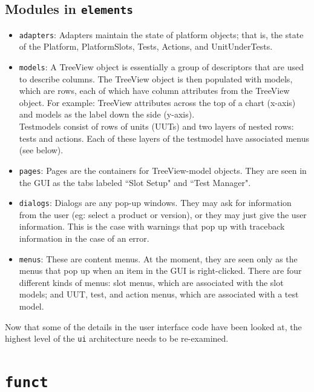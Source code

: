 \documentclass{report}
\begin{document}
\subsection{Modules in \texttt{elements}}

\begin{itemize}
	\item\texttt{adapters}: Adapters maintain the state of platform objects; that is, the state of the Platform, PlatformSlots, Tests, Actions, and UnitUnderTests.
	\item\texttt{models}: A TreeView object is essentially a group of descriptors that are used to describe columns. The TreeView object is then populated with models, which are rows, each of which have column attributes from the TreeView object. For example: TreeView attributes across the top of a chart (x-axis) and models as the label down the side (y-axis).\\
	Testmodels consist of rows of units (UUTs) and two layers of nested rows: tests and actions. Each of these layers of the testmodel have associated menus (see below).
	\item\texttt{pages}: Pages are the containers for TreeView-model objects. They are seen in the GUI as the tabs labeled ``Slot Setup" and ``Test Manager".
	\item\texttt{dialogs}: Dialogs are any pop-up windows. They may ask for information from the user (eg: select a product or version), or they may just give the user information. This is the case with warnings that pop up with traceback information in the case of an error.
	\item\texttt{menus}: These are content menus. At the moment, they are seen only as the menus that pop up when an item in the GUI is right-clicked. There are four different kinds of menus: slot menus, which are associated with the slot models; and UUT, test, and action menus, which are associated with a test model.
\end{itemize}

Now that some of the details in the user interface code have been looked at, the highest level of the \texttt{ui} architecture needs to be re-examined. %
\section{\texttt{funct}}
\newpage
\end{document}
